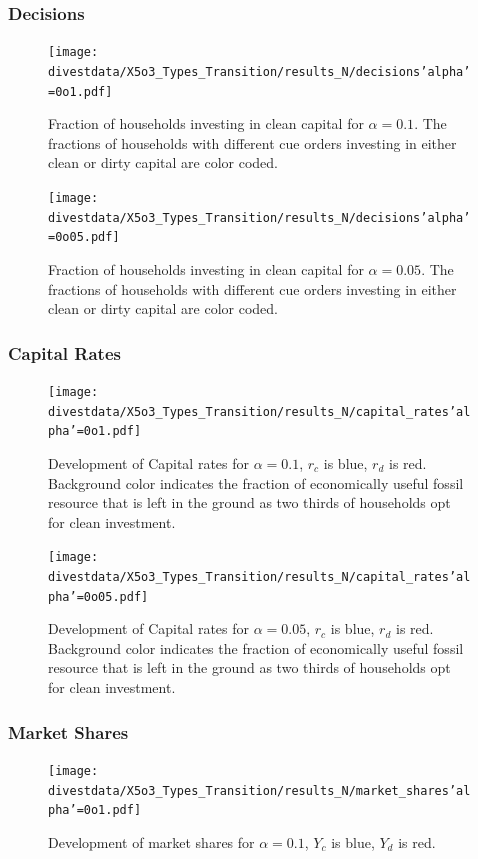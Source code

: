 \subsubsection{Decisions}
\begin{figure}[H]
	\centering
	\texttt{[image: divestdata/X5o3\_Types\_Transition/results\_N/decisions'alpha'=0o1.pdf]}
	\caption{Fraction of households investing in clean capital for $\alpha=0.1$. The fractions of households with different cue orders investing in either clean or dirty capital are color coded.}
	\label{5o3_1}
\end{figure}
\begin{figure}[H]
	\centering
	\texttt{[image: divestdata/X5o3\_Types\_Transition/results\_N/decisions'alpha'=0o05.pdf]}
	\caption{Fraction of households investing in clean capital for $\alpha=0.05$. The fractions of households with different cue orders investing in either clean or dirty capital are color coded.}
	\label{5o3_2}
\end{figure} 
\subsubsection{Capital Rates}
\begin{figure}[H]
	\centering
	\texttt{[image: divestdata/X5o3\_Types\_Transition/results\_N/capital\_rates'alpha'=0o1.pdf]}
	\caption{Development of Capital rates for $\alpha=0.1$, $r_c$ is blue, $r_d$ is red. Background color indicates the fraction of economically useful fossil resource that is left in the ground as two thirds of households opt for clean investment.}
	\label{5o3_3}
\end{figure}

\begin{figure}[H]
	\centering
	\texttt{[image: divestdata/X5o3\_Types\_Transition/results\_N/capital\_rates'alpha'=0o05.pdf]}
	\caption{Development of Capital rates for $\alpha=0.05$, $r_c$ is blue, $r_d$ is red. Background color indicates the fraction of economically useful fossil resource that is left in the ground as two thirds of households opt for clean investment.}

\end{figure}
\subsubsection{Market Shares}
\begin{figure}[H]
	\centering
	\texttt{[image: divestdata/X5o3\_Types\_Transition/results\_N/market\_shares'alpha'=0o1.pdf]}
	\caption{Development of market shares for $\alpha=0.1$, $Y_c$ is blue, $Y_d$ is red.}

\end{figure}

